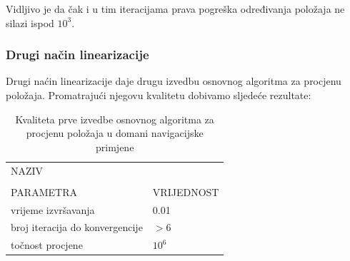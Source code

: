 \documentclass[a4paper,twoside,12pt]{memoir} %
\begin{document}
Vidljivo je da čak i u tim iteracijama
prava pogreška određivanja položaja ne silazi ispod $10^3$.

\subsubsection{Drugi način linearizacije}
Drugi naćin linearizacije daje drugu izvedbu osnovnog algoritma za procjenu položaja.
Promatrajući njegovu kvalitetu dobivamo sljedeće rezultate:
\begin{table}[H]
	\caption{Kvaliteta prve izvedbe osnovnog algoritma za procjenu položaja u domani navigacijske primjene}
	\begin{center}
		\begin{tabular}{|p{3cm}|p{4cm}}
			\hline
			\rowcolor{lightgray}NAZIV&   \\
			\rowcolor{lightgray}&   \\
			\multirow{-3}{1cm}{ \cellcolor{lightgray}PARAMETRA} & \multirow{-3}{2cm}{\cellcolor{lightgray}VRIJEDNOST} \\
			\hline
			\vspace{0.1cm}
			vrijeme izvršavanja & \vspace{0.1cm}  0.01\\
			\vspace{0.1cm}
			broj iteracija do konvergencije & \vspace{0.1cm} $> 6$ \\
			\vspace{0.1cm}
			točnost procjene & \vspace{0.1cm} $10^6$ \\
			\hline
		\end{tabular}
	\end{center}
\end{table}
\end{document}
